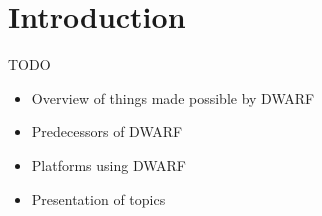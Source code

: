 
\section{Introduction}


\begin{frame}{TODO}
\begin{itemize}
\item Overview of things made possible by DWARF
\item Predecessors of DWARF
\item Platforms using DWARF
\item Presentation of topics
\end{itemize}
\end{frame}
